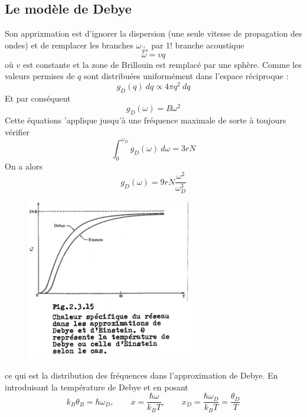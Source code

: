 	\newpage
	\subsection{Le modèle de Debye}
	Son apprixmation est d'ignorer la dispersion (une seule vitesse de propagation 
	des ondes) et de remplacer les branches $\omega_{\vec{q}s}$ par 1! branche 
	acoustique
	\begin{equation}
	\omega = vq
	\end{equation}
	où $v$ est constante et la zone de Brillouin est remplacé par une  sphère. 
	Comme les valeurs permises de $q$ sont distribuées uniformément dans l'espace 
	réciproque :
	\begin{equation}
	g_D(q)\ dq \propto 4\pi q^2\ dq
	\end{equation}
	Et par conséquent
	\begin{equation}
	g_D(\omega) = B\omega^2
	\end{equation}
	Cette équations 'applique jusqu'à une fréquence maximale de sorte à toujours 
	vérifier 
	\begin{equation}
	\int_0^{\omega_D} g_D(\omega)\ d\omega = 3rN
	\end{equation}
	On a alors
	\begin{equation}
	g_D(\omega) = 9rN\dfrac{\omega^2}{\omega_D^3}
	\end{equation}
	\begin{figure}
	\vspace{-0.6cm}
	\includegraphics[scale=0.5]{ch7/image3.png}
	\end{figure}
	ce qui est la distribution des fréquences dans l'approximation de Debye. En 
	introduisant la température de Debye et en posant
	\begin{equation}
	k_B\theta_B = \hbar\omega_D,\qquad x=\dfrac{\hbar\omega}{k_BT},\qquad x_D = 
	\dfrac{\hbar\omega_D}{k_BT}=\dfrac{\theta_D}{T}
	\end{equation}
